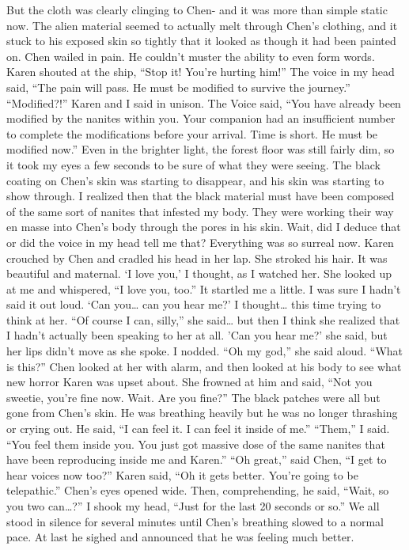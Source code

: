 \documentclass[a4paper]{article}
\begin{document}
But the cloth was clearly clinging to Chen- and it was more than simple static now. The alien material seemed to actually melt through Chen’s clothing, and it stuck to his exposed skin so tightly that it looked as though it had been painted on. Chen wailed in pain. He couldn’t muster the ability to even form words.
Karen shouted at the ship, “Stop it! You’re hurting him!”
The voice in my head said, “The pain will pass. He must be modified to survive the journey.”
“Modified?!” Karen and I said in unison.
The Voice said, “You have already been modified by the nanites within you. Your companion had an insufficient number to complete the modifications before your arrival. Time is short. He must be modified now.”
Even in the brighter light, the forest floor was still fairly dim, so it took my eyes a few seconds to be sure of what they were seeing. The black coating on Chen’s skin was starting to disappear, and his skin was starting to show through. I realized then that the black material must have been composed of the same sort of nanites that infested my body. They were working their way en masse into Chen’s body through the pores in his skin.
Wait, did I deduce that or did the voice in my head tell me that? Everything was so surreal now.
Karen crouched by Chen and cradled his head in her lap. She stroked his hair. It was beautiful and maternal. ‘I love you,’ I thought, as I watched her.
She looked up at me and whispered, “I love you, too.”
It startled me a little. I was sure I hadn’t said it out loud. ‘Can you… can you hear me?’ I thought… this time trying to think at her.
“Of course I can, silly,” she said… but then I think she realized that I hadn’t actually been speaking to her at all.
'Can you hear me?' she said, but her lips didn’t move as she spoke.
I nodded.
“Oh my god,” she said aloud. “What is this?”
Chen looked at her with alarm, and then looked at his body to see what new horror Karen was upset about. She frowned at him and said, “Not you sweetie, you’re fine now. Wait. Are you fine?”
The black patches were all but gone from Chen’s skin. He was breathing heavily but he was no longer thrashing or crying out. He said, “I can feel it. I can feel it inside of me.”
“Them,” I said. “You feel them inside you. You just got massive dose of the same nanites that have been reproducing inside me and Karen.”
“Oh great,” said Chen, “I get to hear voices now too?”
Karen said, “Oh it gets better. You’re going to be telepathic.”
Chen’s eyes opened wide. Then, comprehending, he said, “Wait, so you two can…?”
I shook my head, “Just for the last 20 seconds or so.”
We all stood in silence for several minutes until Chen’s breathing slowed to a normal pace. At last he sighed and announced that he was feeling much better.
\end{document}
